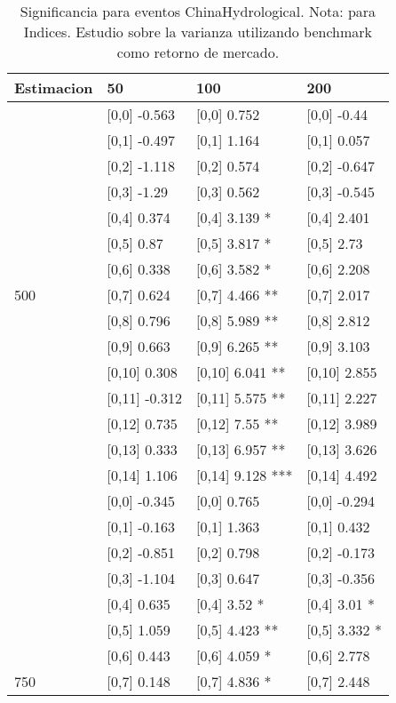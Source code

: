 \begin{table}

\caption{Significancia para eventos ChinaHydrological. Nota: para Indices. Estudio sobre la varianza utilizando benchmark como retorno de mercado.}
\centering
\begin{tabular}[t]{llll}
\toprule
Estimacion & 50 & 100 & 200\\
\midrule
 & {}[0,0] -0.563 & {}[0,0] 0.752 & {}[0,0] -0.44\\
 & {}[0,1] -0.497 & {}[0,1] 1.164 & {}[0,1] 0.057\\
 & {}[0,2] -1.118 & {}[0,2] 0.574 & {}[0,2] -0.647\\
 & {}[0,3] -1.29 & {}[0,3] 0.562 & {}[0,3] -0.545\\
 & {}[0,4] 0.374 & {}[0,4] 3.139 * & {}[0,4] 2.401\\
\addlinespace
 & {}[0,5] 0.87 & {}[0,5] 3.817 * & {}[0,5] 2.73\\
 & {}[0,6] 0.338 & {}[0,6] 3.582 * & {}[0,6] 2.208\\
500 & {}[0,7] 0.624 & {}[0,7] 4.466 ** & {}[0,7] 2.017\\
 & {}[0,8] 0.796 & {}[0,8] 5.989 ** & {}[0,8] 2.812\\
 & {}[0,9] 0.663 & {}[0,9] 6.265 ** & {}[0,9] 3.103\\
\addlinespace
 & {}[0,10] 0.308 & {}[0,10] 6.041 ** & {}[0,10] 2.855\\
 & {}[0,11] -0.312 & {}[0,11] 5.575 ** & {}[0,11] 2.227\\
 & {}[0,12] 0.735 & {}[0,12] 7.55 ** & {}[0,12] 3.989\\
 & {}[0,13] 0.333 & {}[0,13] 6.957 ** & {}[0,13] 3.626\\
 & {}[0,14] 1.106 & {}[0,14] 9.128 *** & {}[0,14] 4.492\\
\addlinespace
 & {}[0,0] -0.345 & {}[0,0] 0.765 & {}[0,0] -0.294\\
 & {}[0,1] -0.163 & {}[0,1] 1.363 & {}[0,1] 0.432\\
 & {}[0,2] -0.851 & {}[0,2] 0.798 & {}[0,2] -0.173\\
 & {}[0,3] -1.104 & {}[0,3] 0.647 & {}[0,3] -0.356\\
 & {}[0,4] 0.635 & {}[0,4] 3.52 * & {}[0,4] 3.01 *\\
\addlinespace
 & {}[0,5] 1.059 & {}[0,5] 4.423 ** & {}[0,5] 3.332 *\\
 & {}[0,6] 0.443 & {}[0,6] 4.059 * & {}[0,6] 2.778\\
750 & {}[0,7] 0.148 & {}[0,7] 4.836 * & {}[0,7] 2.448\\

\end{tabular}
\end{table}
